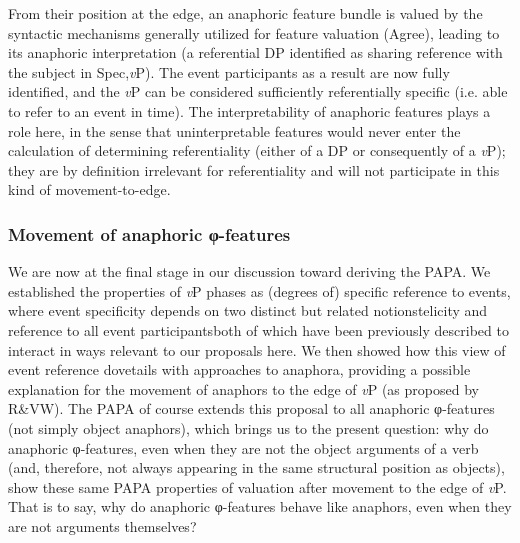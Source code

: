 \documentclass[output=paper
,modfonts
,nonflat
]{langsci/langscibook}
\begin{document}
From their position at the edge, an anaphoric feature bundle is valued by the syntactic mechanisms generally utilized for feature valuation (Agree), leading to its anaphoric interpretation (a referential DP identified as sharing reference with the subject in Spec,\textit{v}P). The event participants as a result are now fully identified, and the \textit{v}P can be considered sufficiently referentially specific (i.e. able to refer to an event in time). The interpretability of anaphoric features plays a role here, in the sense that uninterpretable features would never enter the calculation of determining referentiality (either of a DP or consequently of a \textit{v}P); they are by definition irrelevant for referentiality and will not participate in this kind of movement-to-edge.

\subsubsection{Movement of anaphoric φ-features}

We are now at the final stage in our discussion toward deriving the PAPA. We established the properties of \textit{v}P phases as (degrees of) specific reference to events, where event specificity depends on two distinct but related notions\textemdash telicity and reference to all event participants\textemdash both of which have been previously described to interact in ways relevant to our proposals here. We then showed how this view of event reference dovetails with approaches to anaphora, providing a possible explanation for the movement of anaphors to the edge of \textit{v}P (as proposed by R\&VW). The PAPA of course extends this proposal to all anaphoric φ-features (not simply object anaphors), which brings us to the present question: why do anaphoric φ-features, even when they are not the object arguments of a verb (and, therefore, not always appearing in the same structural position as objects), show these same PAPA properties of valuation after movement to the edge of \textit{v}P.  That is to say, why do anaphoric φ-features behave like anaphors, even when they are not arguments themselves?
\end{document}
